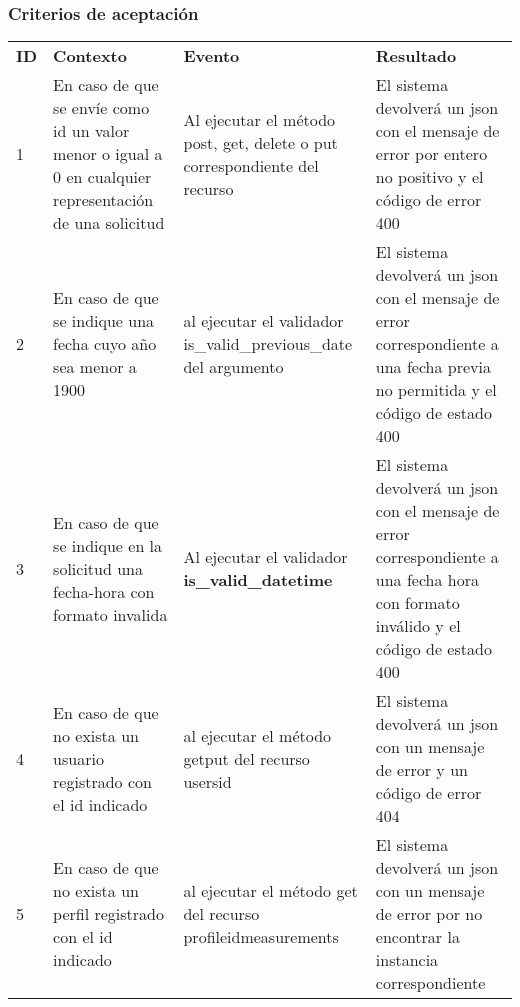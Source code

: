 \subsubsection{Criterios de aceptación}
\begin{center}
	\begin{longtable}{|m{0.5cm}|m{3.5cm}|m{3.5cm}|m{4.5cm}|}
		\hline \rowcolor[gray]{0.9}
		\multicolumn{4}{|c|}{\textbf{Criterio de aceptación}} \\
		\hline  \rowcolor[gray]{0.9}
		\textbf{ID} &
		\textbf{Contexto} &
		\textbf{Evento}&
		\textbf{Resultado} \\
		\hline
		\endhead
		1&En caso de que se envíe como id un valor menor o igual a 0 en cualquier representación  de una solicitud & Al ejecutar el método post, get, delete o put correspondiente del recurso & El sistema devolverá un json con el mensaje de error por entero no positivo y el código de error 400 \\ \hline
		\hline
		2&En caso de que se indique una fecha cuyo año sea menor a 1900 & al ejecutar el validador is\_valid\_previous\_date del argumento  & El sistema devolverá un json con el mensaje de error correspondiente a una fecha previa no permitida y el código de estado 400 \\ 		\hline
		\hline
		3&En caso de que se indique en la solicitud una fecha-hora con formato invalida 
		& Al ejecutar el validador \textbf{ is\_valid\_datetime}  & El sistema devolverá un json con el mensaje de error correspondiente a una fecha hora con formato inválido y el código de estado 400\\ \hline
		\hline
		4&En caso de que no exista un usuario registrado con el id indicado & al ejecutar el método get\/put del recurso \/users\/id  & El sistema devolverá un json con un mensaje de error y un código de error 404 \\ \hline
		\hline
		5&En caso de que no exista un perfil registrado con el id indicado & al ejecutar el método get del recurso \/profile\/id\/measurements  & El sistema devolverá un json con un mensaje de error por no encontrar la instancia correspondiente \\ \hline
		
	\end{longtable}
\end{center}

\begin{comment}
Cuando paso un entero no positivo no responde con error sino que query or get 404 no encuentra el registro.
El método get_latest_by_profile es del sprint2 cierto?
\end{comment}



